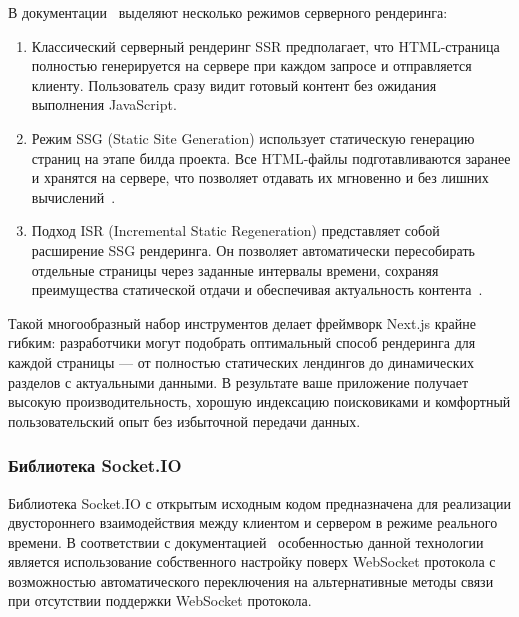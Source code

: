 В документации~\cite{nextjs_ssr} выделяют несколько режимов серверного рендеринга:
\begin{enumerate}
  \item Классический серверный рендеринг SSR предполагает, что HTML-страница полностью генерируется на сервере при каждом запросе и отправляется клиенту. Пользователь сразу видит готовый контент без ожидания выполнения JavaScript.
  \item Режим SSG (Static Site Generation) использует статическую генерацию страниц на этапе билда проекта. Все HTML-файлы подготавливаются заранее и хранятся на сервере, что позволяет отдавать их мгновенно и без лишних вычислений~\cite{nextjs_ssg_isr}.
  \item Подход ISR (Incremental Static Regeneration) представляет собой расширение SSG рендеринга. Он позволяет автоматически пересобирать отдельные страницы через заданные интервалы времени, сохраняя преимущества статической отдачи и обеспечивая актуальность контента~\cite{nextjs_ssg_isr}.
\end{enumerate}


Такой многообразный набор инструментов делает фреймворк Next.js крайне гибким: разработчики могут подобрать оптимальный способ рендеринга для каждой страницы --- от полностью статических лендингов до динамических разделов с актуальными данными. В результате ваше приложение получает высокую производительность, хорошую индексацию поисковиками и комфортный пользовательский опыт без избыточной передачи данных.

\subsubsection*{Библиотека Socket.IO}

Библиотека Socket.IO с открытым исходным кодом предназначена для реализации двустороннего взаимодействия между клиентом и сервером в режиме реального времени. В соответствии с документацией~\cite{socketio_docs} особенностью данной технологии является использование собственного настройку поверх WebSocket протокола с возможностью автоматического переключения на альтернативные методы связи при отсутствии поддержки WebSocket протокола.

